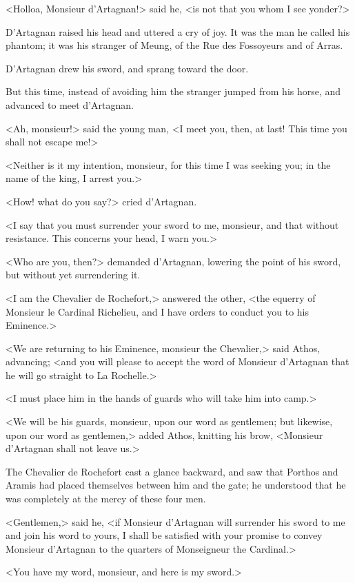<Holloa, Monsieur d'Artagnan!> said he, <is not that you whom I see yonder?> 

D'Artagnan raised his head and uttered a cry of joy. It was the man he called his phantom; it was his stranger of Meung, of the Rue des Fossoyeurs and of Arras. 

D'Artagnan drew his sword, and sprang toward the door. 

But this time, instead of avoiding him the stranger jumped from his horse, and advanced to meet d'Artagnan. 

<Ah, monsieur!> said the young man, <I meet you, then, at last! This time you shall not escape me!> 

<Neither is it my intention, monsieur, for this time I was seeking you; in the name of the king, I arrest you.> 

<How! what do you say?> cried d'Artagnan. 

<I say that you must surrender your sword to me, monsieur, and that without resistance. This concerns your head, I warn you.> 

<Who are you, then?> demanded d'Artagnan, lowering the point of his sword, but without yet surrendering it. 

<I am the Chevalier de Rochefort,> answered the other, <the equerry of Monsieur le Cardinal Richelieu, and I have orders to conduct you to his Eminence.> 

<We are returning to his Eminence, monsieur the Chevalier,> said Athos, advancing; <and you will please to accept the word of Monsieur d'Artagnan that he will go straight to La Rochelle.> 

<I must place him in the hands of guards who will take him into camp.> 

<We will be his guards, monsieur, upon our word as gentlemen; but likewise, upon our word as gentlemen,> added Athos, knitting his brow, <Monsieur d'Artagnan shall not leave us.> 

The Chevalier de Rochefort cast a glance backward, and saw that Porthos and Aramis had placed themselves between him and the gate; he understood that he was completely at the mercy of these four men. 

<Gentlemen,> said he, <if Monsieur d'Artagnan will surrender his sword to me and join his word to yours, I shall be satisfied with your promise to convey Monsieur d'Artagnan to the quarters of Monseigneur the Cardinal.> 

<You have my word, monsieur, and here is my sword.> 

